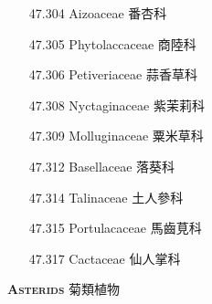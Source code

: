 \begin{enumerate}
\begin{enumerate}
        
      \item[47.304] Aizoaceae 番杏科     
        
      \item[47.305] Phytolaccaceae 商陸科     
        
      \item[47.306] Petiveriaceae 蒜香草科     
        
      \item[47.308] Nyctaginaceae 紫茉莉科     
        
      \item[47.309] Molluginaceae 粟米草科     
        
      \item[47.312] Basellaceae 落葵科     
        
      \item[47.314] Talinaceae 土人參科     
        
      \item[47.315] Portulacaceae 馬齒莧科     
        
      \item[47.317] Cactaceae 仙人掌科     
        
    \end{enumerate}
\end{enumerate}
\vspace{2ex} 
\noindent \normalsize\textsc{\textbf{Asterids} 菊類植物}\selectfont \\
\footnotesize\selectfont
